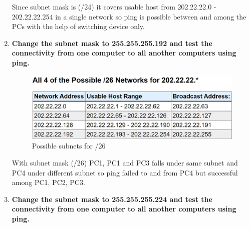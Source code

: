 \documentclass[a4paper,11pt]{article}
\begin{document}
\begin{enumerate}
          Since subnet mask is (/24) it covers usable host from 202.22.22.0 - 202.22.22.254 in a single network so ping is possible between and among the PCs with the help of switching device only.


    \item \textbf{ Change the subnet mask to 255.255.255.192 and test the connectivity from one computer
              to all another computers using ping.}



          \begin{figure}[H]
              \centering
              \includegraphics[scale=0.7,cframe=blue 0.5pt 3pt]{./FIG/A26.jpg}
              \caption{Possible subnets for /26 }
          \end{figure}


          With subnet mask (/26)  PC1, PC1 and PC3 falls under same subnet  and PC4 under different subnet so ping failed to and from PC4 but successful among PC1, PC2, PC3.


    \item \textbf{ Change the subnet mask to 255.255.255.224 and test the connectivity from one computer
              to all another computers using ping.}




\end{enumerate}
\end{document}
